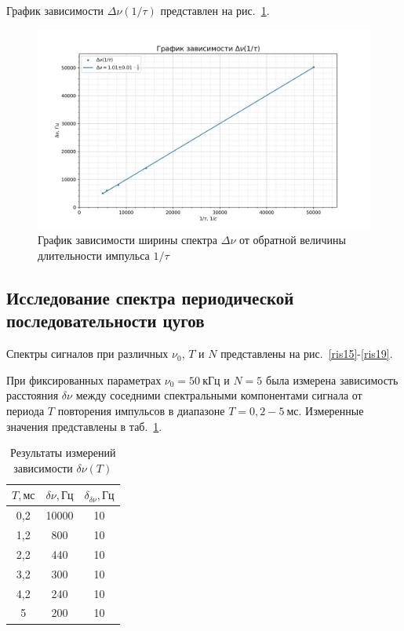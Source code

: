 \documentclass[a4paper, 12pt]{article}
\begin{document}
График зависимости $\Delta{\nu}(1/\tau)$ представлен на рис.~\ref{plot1}.

\begin{figure}[h!]
\begin{flushleft}
    \includegraphics[scale=0.7]{3.6.1_1.png}
\end{flushleft}
\caption{График зависимости ширины спектра $\Delta{\nu}$ от обратной величины длительности импульса $1/\tau$}
\label{plot1}
\end{figure}

\newpage

\subsection{Исследование спектра периодической последовательности цугов}

Спектры сигналов при различных $\nu_0$, $T$ и $N$ представлены на рис.~\ref{ris15}-\ref{ris19}.

При фиксированных параметрах $\nu_0 = 50~кГц$ и $N = 5$ была измерена зависимость расстояния $\delta{\nu}$ между соседними спектральными компонентами сигнала от периода $T$ повторения импульсов в диапазоне $T = 0,2 - 5~мс$. Измеренные значения представлены в таб.~\ref{tab3}.

\begin{table}[h!]
\begin{center}
\begin{tabular}{|c|c|c|}
\hline
$T, мс$ & $\delta{\nu}, Гц$ & $\delta_{\delta{\nu}}, Гц$ \\ \hline
0,2 & 10000 & 10 \\ \hline
1,2 & 800 & 10 \\ \hline
2,2 & 440 & 10 \\ \hline
3,2 & 300 & 10 \\ \hline
4,2 & 240 & 10 \\ \hline
5 & 200 & 10 \\ \hline
\end{tabular}
\end{center}
\caption{Результаты измерений зависимости $\delta{\nu}(T)$}
\label{tab3}
\end{table}
\end{document}
